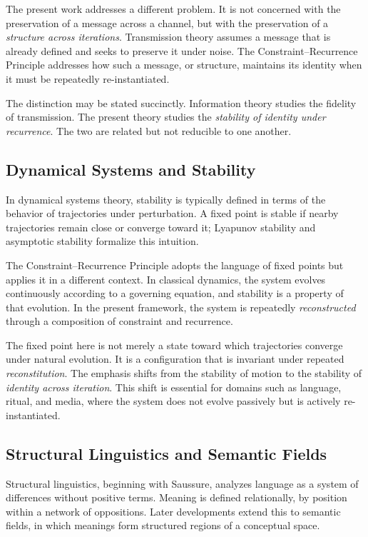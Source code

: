 \documentclass[12pt, oneside]{article}
\theoremstyle{definition}
\theoremstyle{remark}
\begin{document}
The present work addresses a different problem.
It is not concerned with the preservation of a message across a channel, but with the preservation of a \emph{structure across iterations}.
Transmission theory assumes a message that is already defined and seeks to preserve it under noise.
The Constraint--Recurrence Principle addresses how such a message, or structure, maintains its identity when it must be repeatedly re-instantiated.

The distinction may be stated succinctly.
Information theory studies the fidelity of transmission.
The present theory studies the \emph{stability of identity under recurrence}.
The two are related but not reducible to one another.

\subsection{Dynamical Systems and Stability}

In dynamical systems theory, stability is typically defined in terms of the behavior of trajectories under perturbation.
A fixed point is stable if nearby trajectories remain close or converge toward it; Lyapunov stability and asymptotic stability formalize this intuition.

The Constraint--Recurrence Principle adopts the language of fixed points but applies it in a different context.
In classical dynamics, the system evolves continuously according to a governing equation, and stability is a property of that evolution.
In the present framework, the system is repeatedly \emph{reconstructed} through a composition of constraint and recurrence.

The fixed point here is not merely a state toward which trajectories converge under natural evolution.
It is a configuration that is invariant under repeated \emph{reconstitution}.
The emphasis shifts from the stability of motion to the stability of \emph{identity across iteration}.
This shift is essential for domains such as language, ritual, and media, where the system does not evolve passively but is actively re-instantiated.

\subsection{Structural Linguistics and Semantic Fields}

Structural linguistics, beginning with Saussure, analyzes language as a system of differences without positive terms.
Meaning is defined relationally, by position within a network of oppositions.
Later developments extend this to semantic fields, in which meanings form structured regions of a conceptual space.
\end{document}
